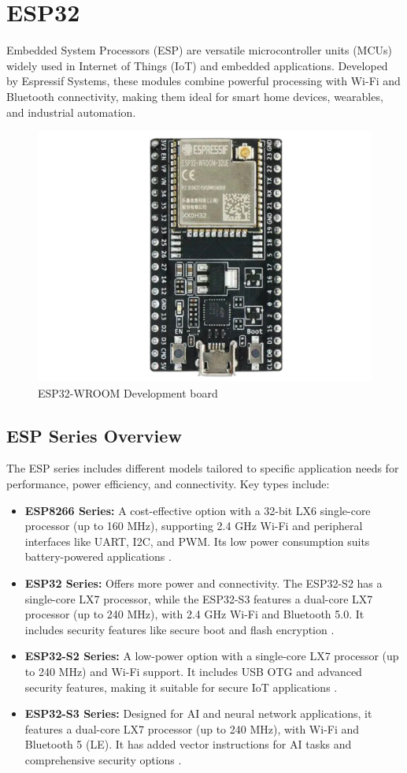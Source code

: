 \section{ESP32}

Embedded System Processors (ESP) are versatile microcontroller units (MCUs) widely used in Internet of Things (IoT) and embedded applications. Developed by Espressif Systems, these modules combine powerful processing with Wi-Fi and Bluetooth connectivity, making them ideal for smart home devices, wearables, and industrial automation.

\begin{figure}[h!]
	\centering
	\includegraphics[width=0.4\linewidth]{assets/ch2/esp32}
	\caption{ESP32-WROOM Development board}
	\label{fig:esp32}
\end{figure}

\subsection{ESP Series Overview}

The ESP series includes different models tailored to specific application needs for performance, power efficiency, and connectivity. Key types include:

\begin{itemize}
	\item \textbf{ESP8266 Series:} A cost-effective option with a 32-bit LX6 single-core processor (up to 160 MHz), supporting 2.4 GHz Wi-Fi and peripheral interfaces like UART, I2C, and PWM. Its low power consumption suits battery-powered applications \cite{EspressifModules}.
	
	\item \textbf{ESP32 Series:} Offers more power and connectivity. The ESP32-S2 has a single-core LX7 processor, while the ESP32-S3 features a dual-core LX7 processor (up to 240 MHz), with 2.4 GHz Wi-Fi and Bluetooth 5.0. It includes security features like secure boot and flash encryption \cite{EspressifModules}.
	
	\item \textbf{ESP32-S2 Series:} A low-power option with a single-core LX7 processor (up to 240 MHz) and Wi-Fi support. It includes USB OTG and advanced security features, making it suitable for secure IoT applications \cite{EspressifModules}.
	
	\item \textbf{ESP32-S3 Series:} Designed for AI and neural network applications, it features a dual-core LX7 processor (up to 240 MHz), with Wi-Fi and Bluetooth 5 (LE). It has added vector instructions for AI tasks and comprehensive security options \cite{EspressifModules}.
\end{itemize}

